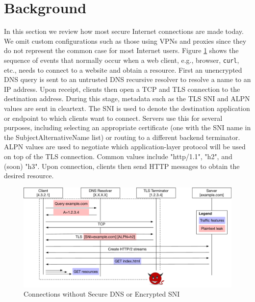 \documentclass[runningheads]{llncs}
\begin{document}

\section{Background}
In this section we review how most secure Internet connections are made today. We omit custom 
configurations such as those using VPNs and proxies since they do not represent the common case
for most Internet users. Figure \ref{fig:connections-then} shows the sequence of events that 
normally occur when a web client, e.g., browser, {\tt curl}, etc., needs to connect to a website 
and obtain a resource. First an unencrypted DNS query is sent to an untrusted DNS recursive 
resolver to resolve a name to an IP address. Upon receipt, clients then open a TCP and TLS 
connection to the destination address. During this stage, metadata such as the TLS SNI and ALPN
values are sent in cleartext. The SNI is used to denote the destination application or endpoint
to which clients want to connect. Servers use this for several purposes, including selecting
an appropriate certificate (one with the SNI name in the SubjectAlternativeName list) or
routing to a different backend terminator. ALPN values are used to negotiate which application-layer
protocol will be used on top of the TLS connection. Common values include "http/1.1", "h2", and 
(soon) "h3". Upon connection, clients then send HTTP messages to obtain the desired resource. 

\begin{figure}
\includegraphics[scale=0.35]{figures/connection_flow}
\caption{Connections without Secure DNS or Encrypted SNI}
\label{fig:connections-then}
\end{figure}
\end{document}
